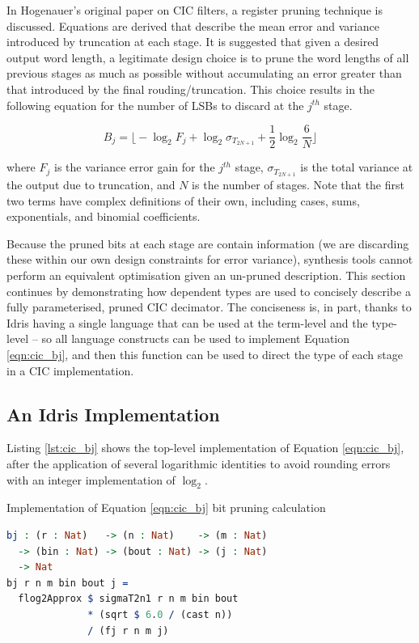 \documentclass[conference]{IEEEtran}
\begin{document}
In Hogenauer's original paper on CIC filters\cite{hogenauer_81}, a register
pruning technique is discussed. Equations are derived that describe the mean
error and variance introduced by truncation at each stage. It is suggested that
given a desired output word length, a legitimate design choice is to prune the
word lengths of all previous stages as much as possible without accumulating an
error greater than that introduced by the final rouding/truncation. This choice
results in the following equation for the number of LSBs to discard at the
$j^{th}$ stage.

\begin{equation}
  B_j = {\Bigg \lfloor} -\log_2F_j + \log_2\sigma_{T_{2N+1}} +\frac{1}{2}\log_2\frac{6}{N} {\Bigg \rfloor}
  \label{eqn:cic_bj}
\end{equation}

where $F_j$ is the variance error gain for the $j^{th}$ stage,
$\sigma_{T_{2N+1}}$ is the total variance at the output due to truncation, and
$N$ is the number of stages. Note that the first two terms have complex
definitions of their own, including cases, sums, exponentials, and binomial
coefficients\cite{hogenauer_81}.

Because the pruned bits at each stage are contain information (we are discarding
these within our own design constraints for error variance), synthesis tools
cannot perform an equivalent optimisation given an un-pruned description. This
section continues by demonstrating how dependent types are used to concisely
describe a fully parameterised, pruned CIC decimator. The conciseness is, in
part, thanks to Idris having a single language that can be used at the
term-level and the type-level -- so all language constructs can be used to
implement Equation \ref{eqn:cic_bj}, and then this function can be used to
direct the type of each stage in a CIC implementation.

\subsection{An Idris Implementation}

Listing \ref{lst:cic_bj} shows the top-level implementation of Equation
\ref{eqn:cic_bj}, after the application of several logarithmic identities to
avoid rounding errors with an integer implementation of $\log_2$.

\begin{codefig}[h]
  \caption{Implementation of Equation \ref{eqn:cic_bj} bit pruning calculation}
\begin{lstlisting}[language=idris]
bj : (r : Nat)   -> (n : Nat)    -> (m : Nat)
  -> (bin : Nat) -> (bout : Nat) -> (j : Nat)
  -> Nat
bj r n m bin bout j =
  flog2Approx $ sigmaT2n1 r n m bin bout
              * (sqrt $ 6.0 / (cast n))
              / (fj r n m j)
\end{lstlisting}
\label{lst:cic_bj}
\end{codefig}
\end{document}
